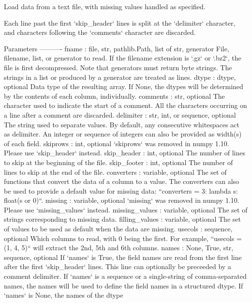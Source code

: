\begin{DoxyVerb}Load data from a text file, with missing values handled as specified.

Each line past the first `skip_header` lines is split at the `delimiter`
character, and characters following the `comments` character are discarded.

Parameters
----------
fname : file, str, pathlib.Path, list of str, generator
    File, filename, list, or generator to read.  If the filename
    extension is `.gz` or `.bz2`, the file is first decompressed. Note
    that generators must return byte strings. The strings
    in a list or produced by a generator are treated as lines.
dtype : dtype, optional
    Data type of the resulting array.
    If None, the dtypes will be determined by the contents of each
    column, individually.
comments : str, optional
    The character used to indicate the start of a comment.
    All the characters occurring on a line after a comment are discarded.
delimiter : str, int, or sequence, optional
    The string used to separate values.  By default, any consecutive
    whitespaces act as delimiter.  An integer or sequence of integers
    can also be provided as width(s) of each field.
skiprows : int, optional
    `skiprows` was removed in numpy 1.10. Please use `skip_header` instead.
skip_header : int, optional
    The number of lines to skip at the beginning of the file.
skip_footer : int, optional
    The number of lines to skip at the end of the file.
converters : variable, optional
    The set of functions that convert the data of a column to a value.
    The converters can also be used to provide a default value
    for missing data: ``converters = {3: lambda s: float(s or 0)}``.
missing : variable, optional
    `missing` was removed in numpy 1.10. Please use `missing_values`
    instead.
missing_values : variable, optional
    The set of strings corresponding to missing data.
filling_values : variable, optional
    The set of values to be used as default when the data are missing.
usecols : sequence, optional
    Which columns to read, with 0 being the first.  For example,
    ``usecols = (1, 4, 5)`` will extract the 2nd, 5th and 6th columns.
names : {None, True, str, sequence}, optional
    If `names` is True, the field names are read from the first line after
    the first `skip_header` lines. This line can optionally be preceeded
    by a comment delimiter. If `names` is a sequence or a single-string of
    comma-separated names, the names will be used to define the field names
    in a structured dtype. If `names` is None, the names of the dtype

\end{DoxyVerb}
